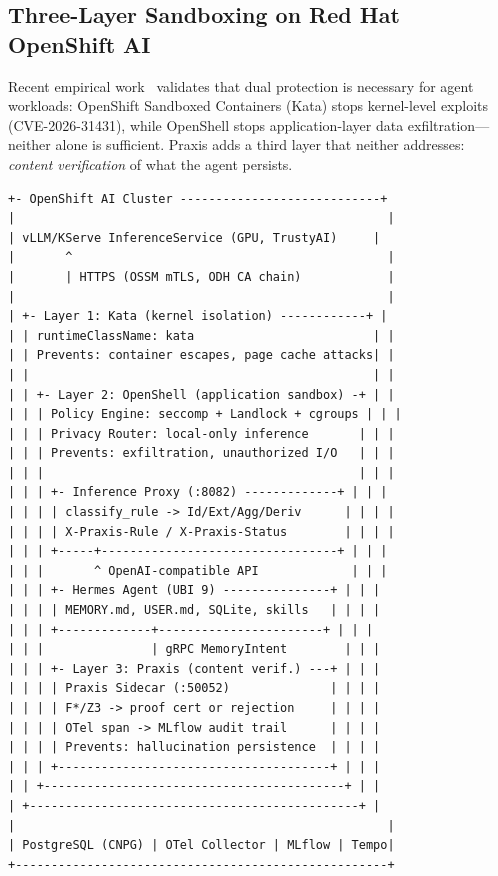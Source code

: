 \documentclass[sigplan,screen,nonacm]{acmart}
\begin{document}
\subsection{Three-Layer Sandboxing on Red Hat OpenShift AI}
\label{sec:threelayer}

Recent empirical work~\cite{osc2026layered} validates that dual protection
is necessary for agent workloads: OpenShift Sandboxed Containers (Kata)
stops kernel-level exploits (CVE-2026-31431), while OpenShell stops
application-layer data exfiltration---neither alone is sufficient. Praxis
adds a third layer that neither addresses: \emph{content verification} of
what the agent persists.

\begin{lstlisting}[language={},caption={Three-layer sandboxing architecture on OpenShift AI.},label={lst:arch}]
+- OpenShift AI Cluster ----------------------------+
|                                                    |
| vLLM/KServe InferenceService (GPU, TrustyAI)     |
|       ^                                            |
|       | HTTPS (OSSM mTLS, ODH CA chain)            |
|                                                    |
| +- Layer 1: Kata (kernel isolation) ------------+ |
| | runtimeClassName: kata                         | |
| | Prevents: container escapes, page cache attacks| |
| |                                                | |
| | +- Layer 2: OpenShell (application sandbox) -+ | |
| | | Policy Engine: seccomp + Landlock + cgroups | | |
| | | Privacy Router: local-only inference       | | |
| | | Prevents: exfiltration, unauthorized I/O   | | |
| | |                                            | | |
| | | +- Inference Proxy (:8082) -------------+ | | |
| | | | classify_rule -> Id/Ext/Agg/Deriv      | | | |
| | | | X-Praxis-Rule / X-Praxis-Status        | | | |
| | | +-----+---------------------------------+ | | |
| | |       ^ OpenAI-compatible API             | | |
| | | +- Hermes Agent (UBI 9) ---------------+ | | |
| | | | MEMORY.md, USER.md, SQLite, skills   | | | |
| | | +-------------+-----------------------+ | | |
| | |               | gRPC MemoryIntent        | | |
| | | +- Layer 3: Praxis (content verif.) ---+ | | |
| | | | Praxis Sidecar (:50052)              | | | |
| | | | F*/Z3 -> proof cert or rejection     | | | |
| | | | OTel span -> MLflow audit trail      | | | |
| | | | Prevents: hallucination persistence  | | | |
| | | +--------------------------------------+ | | |
| | +------------------------------------------+ | |
| +----------------------------------------------+ |
|                                                    |
| PostgreSQL (CNPG) | OTel Collector | MLflow | Tempo|
+----------------------------------------------------+
\end{lstlisting}
\end{document}
